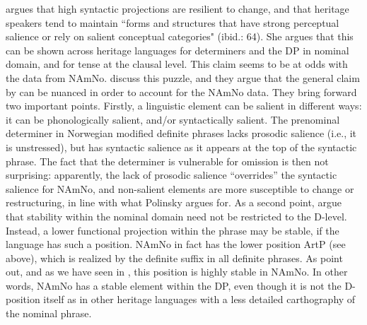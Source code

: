 \documentclass[output=paper]{langscibook}
\begin{document}
\citet{Polinsky2018} argues that high syntactic projections are resilient to change, and that heritage speakers tend to maintain ``forms and structures that have strong perceptual salience or rely on salient conceptual categories" (ibid.: 64). She argues that this can be shown across heritage languages for determiners and the DP in nominal domain, and for tense at the clausal level. This claim seems to be at odds with the data from NAmNo. \citet{LohndalVanBaal2025} discuss this puzzle, and they argue that the general claim by \citet{Polinsky2018} can be nuanced in order to account for the NAmNo data. They bring forward two important points. Firstly, a linguistic element can be salient in different ways: it can be phonologically salient, and/or syntactically salient. The prenominal determiner in Norwegian modified definite phrases lacks prosodic salience (i.e., it is unstressed), but has syntactic salience as it appears at the top of the syntactic phrase. The fact that the determiner is vulnerable for omission is then not surprising: apparently, the lack of prosodic salience “overrides” the syntactic salience for NAmNo, and non-salient elements are more susceptible to change or restructuring, in line with what Polinsky argues for. As a second point, \citet{LohndalVanBaal2025} argue that stability within the nominal domain need not be restricted to the D-level. Instead, a lower functional projection within the phrase may be stable, if the language has such a position. NAmNo in fact has the lower position ArtP (see  above), which is realized by the definite suffix in all definite phrases. As \citet{LohndalVanBaal2025} point out, and as we have seen in , this position is highly stable in NAmNo. In other words, NAmNo has a stable element within the DP, even though it is not the D-position itself as in other heritage languages with a less detailed carthography of the nominal phrase.
 
\end{document}
